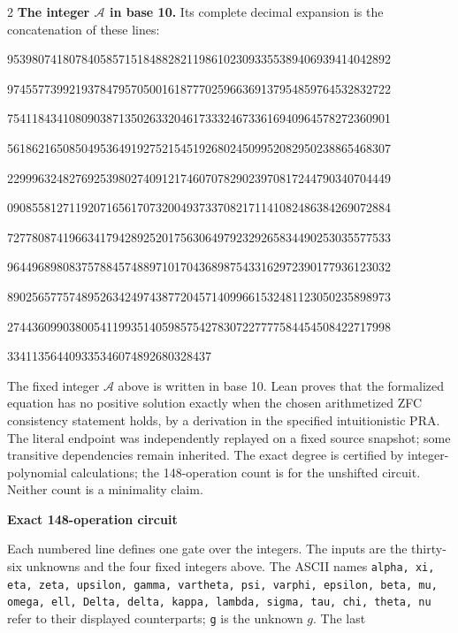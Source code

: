 \documentclass[10pt]{article}
\begin{document}
\begin{multicols}{2}
\textbf{The integer $\mathcal A$ in base 10.}
Its complete decimal expansion is the concatenation of these lines:\par
\begingroup\fontsize{7.7}{8.2}\selectfont{}\par
95398074180784058571518488282119861023093355389406939414042892\par
97455773992193784795705001618777025966369137954859764532832722\par
75411843410809038713502633204617333246733616940964578272360901\par
56186216508504953649192752154519268024509952082950238865468307\par
22999632482769253980274091217460707829023970817244790340704449\par
09085581271192071656170732004937337082171141082486384269072884\par
72778087419663417942892520175630649792329265834490253035577533\par
96449689808375788457488971017043689875433162972390177936123032\par
89025657757489526342497438772045714099661532481123050235898973\par
27443609903800541199351405985754278307227777584454508422717998\par
334113564409335346074892680328437\par
\endgroup
\normalfont\fontsize{7.7}{8.2}\selectfont
The fixed integer $\mathcal A$ above is written in base 10. Lean proves that the formalized equation has no positive solution exactly
when the chosen arithmetized ZFC consistency statement holds, by a derivation
in the specified intuitionistic PRA. The literal endpoint was independently
replayed on a fixed source snapshot; some transitive dependencies remain
inherited. The exact degree is certified by integer-polynomial calculations;
the 148-operation count is for the unshifted circuit. Neither count is a
minimality claim.
\end{multicols}
\clearpage
\begin{center}{\large\bfseries Exact 148-operation circuit}\end{center}
Each numbered line defines one gate over the integers. The inputs are the
thirty-six unknowns and the four fixed integers above. The ASCII names
\texttt{alpha, xi, eta, zeta, upsilon, gamma, vartheta, psi, varphi, epsilon, beta, mu, omega, ell, Delta, delta, kappa, lambda, sigma, tau, chi, theta, nu}
refer to their displayed counterparts; \texttt{g} is the unknown $g$. The last
\end{document}
